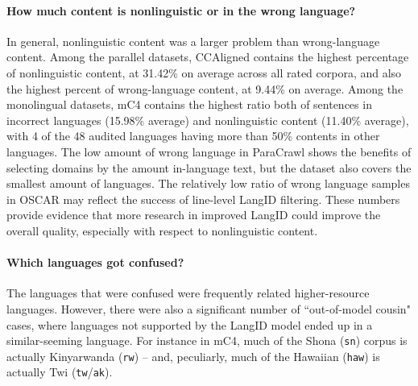 \paragraph{How much content is nonlinguistic or in the wrong language?}
In general, nonlinguistic content was a larger problem than wrong-language content. Among the parallel datasets, CCAligned contains the highest percentage of nonlinguistic content, at 31.42\% on average across all rated corpora, and also the highest percent of wrong-language content, at 9.44\% on average. Among the monolingual datasets, mC4 contains the highest ratio both of sentences in incorrect languages (15.98\% average) and nonlinguistic content (11.40\% average), with 4 of the 48 audited languages having more than 50\% contents in other languages. The low amount of wrong language in ParaCrawl shows the benefits of selecting domains by the amount in-language text, but the dataset also covers the smallest amount of languages. The relatively low ratio of wrong language samples in OSCAR may reflect the success of line-level LangID filtering.
These numbers provide evidence that more research in improved LangID could improve the overall quality, especially with respect to nonlinguistic content.

\paragraph{Which languages got confused?} The languages that were confused were frequently related higher-resource languages. However, there were also a significant number of ``out-of-model cousin" cases, where languages not supported by the LangID model ended up in a similar-seeming language. For instance in mC4, much of the Shona (\texttt{sn}) corpus is actually Kinyarwanda (\texttt{rw}) -- and, peculiarly, much of the Hawaiian (\texttt{haw}) is actually Twi (\texttt{tw}/\texttt{ak}).

